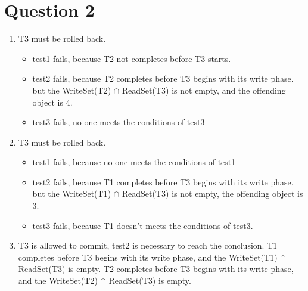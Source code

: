 \documentclass[11pt]{article}
\begin{document}
\section{Question 2}

\begin{enumerate}
		\item
		T3 must be rolled back. 
			\begin{itemize}
				\item
				test1 fails, because T2 not completes before T3 starts.
				\item
				test2 fails, because T2 completes before T3 begins with its write phase. but the 
				WriteSet(T2) $\cap$ ReadSet(T3) is not empty, and the offending object is 4.
				\item
				test3 fails, no one meets the conditions of test3
			\end{itemize}
		
		\item
		T3 must be rolled back. 
			\begin{itemize}
				\item
				test1 fails, because no one meets the conditions of test1
				\item
				test2 fails, because T1 completes before T3 begins with its write phase. but the 
				WriteSet(T1) $\cap$ ReadSet(T3) is not empty, the offending object is 3.
				\item
				test3 fails, because T1 doesn't meets the conditions of test3.
			\end{itemize}				
		
		\item
		T3 is allowed to commit, test2 is necessary to reach the conclusion. T1 completes before T3 
		begins with its write phase, and the WriteSet(T1) $\cap$ ReadSet(T3) is empty. T2 completes 
		before T3 begins with its write phase, and the WriteSet(T2) $\cap$ ReadSet(T3) is empty.			
	
\end{enumerate}
 
\end{document}
